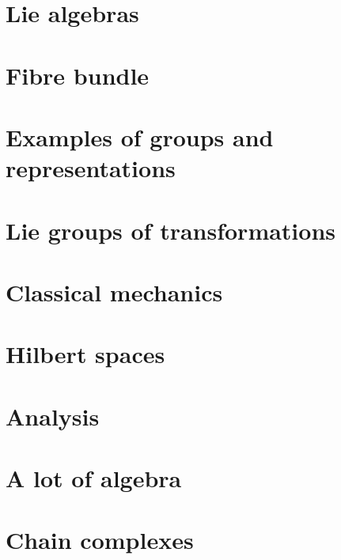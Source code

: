 \chapter{Lie algebras}
  
 





\chapter{Fibre bundle}



\chapter{Examples of groups and representations}        \label{ChapThoComsGroupes}



\chapter{Lie groups of transformations}


\chapter{Classical mechanics}



\chapter{Hilbert spaces}



\chapter{Analysis}









\chapter{A lot of algebra}




\chapter{Chain complexes}


